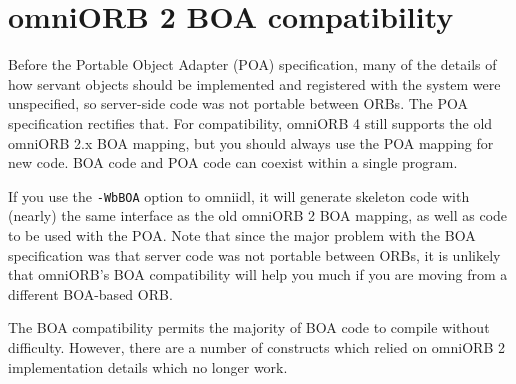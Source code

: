 \documentclass[11pt,oneside,a4paper]{book}
\newcommand{\cmdline}[1]{\texttt{#1}}
\begin{document}
\section{omniORB 2 BOA compatibility}
\label{sec:BOAcompat}

Before the Portable Object Adapter (POA) specification, many of the
details of how servant objects should be implemented and registered
with the system were unspecified, so server-side code was not portable
between ORBs. The POA specification rectifies that. For compatibility,
omniORB 4 still supports the old omniORB 2.x BOA mapping, but you
should always use the POA mapping for new code. BOA code and POA code
can coexist within a single program. 

If you use the \cmdline{-WbBOA} option to omniidl, it will generate
skeleton code with (nearly) the same interface as the old omniORB 2
BOA mapping, as well as code to be used with the POA. Note that since
the major problem with the BOA specification was that server code was
not portable between ORBs, it is unlikely that omniORB's BOA
compatibility will help you much if you are moving from a different
BOA-based ORB.

The BOA compatibility permits the majority of BOA code to compile
without difficulty. However, there are a number of constructs which
relied on omniORB 2 implementation details which no longer work.
\end{document}
